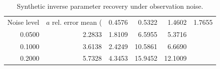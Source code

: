 \begin{table}
\caption{Synthetic inverse parameter recovery under observation noise.}
\label{tab:inverse_recovery}
\begin{tabular}{rrrrr}
\toprule
Noise level & $a$ rel. error mean (%
 & 0.4576 & 0.5322 & 1.4602 & 1.7655 \\
0.0500 & 2.2833 & 1.8109 & 6.5955 & 5.3716 \\
0.1000 & 3.6138 & 2.4249 & 10.5861 & 6.6690 \\
0.2000 & 5.7328 & 4.3453 & 15.9452 & 12.1009 \\
\bottomrule
\end{tabular}
\end{table}
